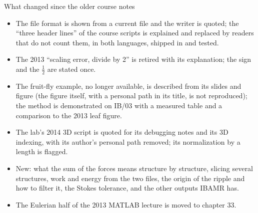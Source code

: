 \documentclass[aspectratio=169,11pt]{beamer}
\begin{document}
\begin{frame}{What changed since the older course notes}
\label{fr:changed}
\footnotesize
\begin{itemize}
  \item The file format is shown from a current file and the writer is quoted; the ``three header lines'' of the course scripts is explained and replaced by readers that do not count them, in both languages, shipped in  and tested.
  \item The 2013 ``scaling error, divide by 2'' is retired with its explanation; the sign and the $\frac12$ are stated once.
  \item The fruit-fly example, no longer available, is described from its slides and figure (the figure itself, with a personal path in its title, is not reproduced); the method is demonstrated on IB/03 with a measured table and a comparison to the 2013 leaf figure.
  \item The lab's 2014 3D script is quoted for its debugging notes and its 3D indexing, with its author's personal path removed; its normalization by a length is flagged.
  \item New: what the sum of the forces means structure by structure, slicing several structures, work and energy from the two files, the origin of the ripple and how to filter it, the Stokes tolerance, and the other outputs IBAMR has.
  \item The Eulerian half of the 2013 MATLAB lecture is moved to chapter 33.
\end{itemize}
\end{frame}
\end{document}
